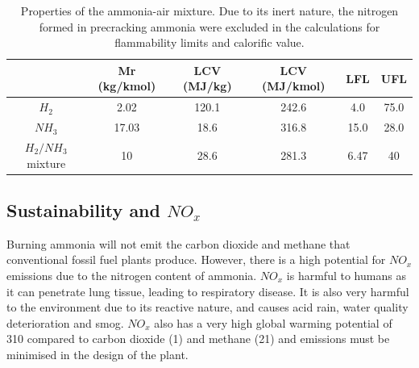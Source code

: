 \documentclass[11pt, oneside]{article}
\begin{document}
\begin{table} [h]
\begin{center}
\caption{Properties of the ammonia-air mixture. Due to its inert nature, the nitrogen formed in precracking ammonia were excluded in the calculations for flammability limits and calorific value. \cite{FL}} \label{tab:mixproperties}
\begin{tabular}{ |c|c|c|c|c|c| }
 \hline
& Mr (kg/kmol) & LCV (MJ/kg) \cite{website:spg}& LCV (MJ/kmol) & LFL & UFL\\ 
 \hline
  $H_2$ & 2.02 & 120.1 & 242.6 & 4.0 & 75.0\\ 
 \hline
$NH_3$ & 17.03 & 18.6 & 316.8 & 15.0 & 28.0\\ 
 \hline
$H_2/NH_3$ mixture & 10 & 28.6 & 281.3 & 6.47 & 40\\
 \hline
\end{tabular}
\end{center} 
\end{table}

\subsection{Sustainability and $NO_x$} \label{ssec:NOx}
Burning ammonia will not emit the carbon dioxide and methane that conventional fossil fuel plants produce. However,  there is a high potential for $NO_x$ emissions due to the nitrogen content of ammonia. $NO_x$ is harmful to humans as it can penetrate lung tissue, leading to respiratory disease. It is also very harmful to the environment due to its reactive nature, and causes acid rain, water quality deterioration and smog. \cite{NOxeffect} $NO_x$ also has a very high global warming potential of 310 compared to carbon dioxide (1) and methane (21) and emissions must be minimised in the design of the plant. \cite{website:NOXGWP} %
\end{document}
